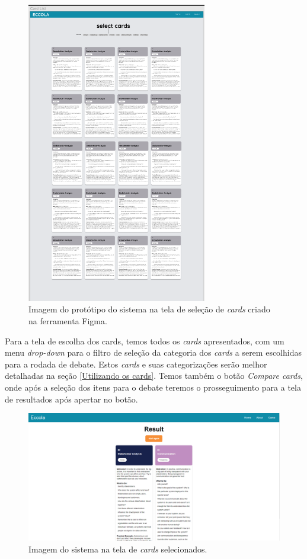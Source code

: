 \begin{figure}[h!]
    \centering
    \includegraphics[width=0.7\textwidth]{img/figma_cards.png}
    \caption{Imagem do protótipo do sistema na tela de seleção de \textit{cards} criado na ferramenta Figma.}
    \label{fig:figma_cards}
\end{figure}

Para a tela de escolha dos cards, temos todos os \textit{cards} apresentados, com um menu \textit{drop-down} para o filtro de seleção da categoria dos \textit{cards} a serem escolhidas para a rodada de debate. Estos \textit{cards} e suas categorizações serão melhor detalhadas na seção \ref{Utilizando os cards}. Temos também o botão \textit{Compare cards}, onde após a seleção dos itens para o debate teremos o prosseguimento para a tela de resultados após apertar no botão.

\begin{figure}[h!]
    \centering
    \includegraphics[width=\textwidth]{img/eccola_results.png}
    \caption{Imagem do sistema na tela de \textit{cards} selecionados.}
    \label{fig:eccola_results}
\end{figure}


